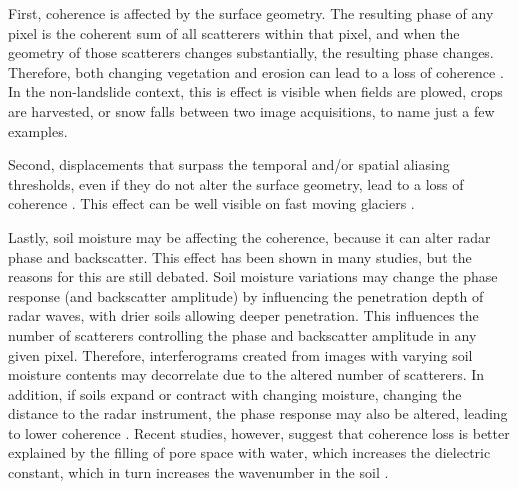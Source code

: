\documentclass[nhess, manuscript]{copernicus}
\begin{document}
First, coherence is affected by the surface geometry. The resulting phase of any pixel is the coherent sum of all scatterers within that pixel, and when the geometry of those scatterers changes substantially, the resulting phase changes. Therefore, both changing vegetation and erosion can lead to a loss of coherence \citep{massonnet1998, rosen2000, ruescas2009}. In the non-landslide context, this is effect is visible when fields are plowed, crops are harvested, or snow falls between two image acquisitions, to name just a few examples.\par
Second, displacements that surpass the temporal and/or spatial aliasing thresholds, even if they do not alter the surface geometry, lead to a loss of coherence \citep[e.g.,][]{massonnet1998, rocca2000, zhou2009, wasowski2014, manconi2018}. This effect can be well visible on fast moving glaciers \cite[e.g.,][]{joughin1996}.\par
Lastly, soil moisture may be affecting the coherence, because it can alter radar phase and backscatter. This effect has been shown in many studies, but the reasons for this are still debated. Soil moisture variations may change the phase response (and backscatter amplitude) by influencing the penetration depth of radar waves, with drier soils allowing deeper penetration. This influences the number of scatterers controlling the phase and backscatter amplitude in any given pixel. Therefore, interferograms created from images with varying soil moisture contents may decorrelate due to the altered number of scatterers. In addition, if soils expand or contract with changing moisture, changing the distance to the radar instrument, the phase response may also be altered, leading to lower coherence \citep{scott2017, rabus2010, nolan2003, ulaby1996}. Recent studies, however, suggest that coherence loss is better explained by the filling of pore space with water, which increases the dielectric constant, which in turn increases the wavenumber in the soil \citep{eshqimolan2020, zwieback2015}. \par
\end{document}
